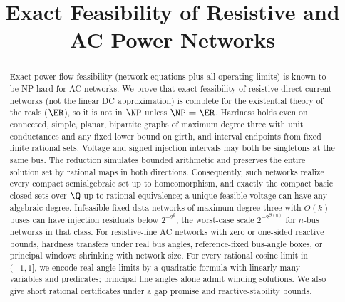 \documentclass[11pt]{article}
\title{Exact Feasibility of Resistive and AC Power Networks}
\author{}
\date{}
\begin{document}
\maketitle
\begin{abstract}
Exact power-flow feasibility (network equations plus all operating limits)
is known to be NP-hard for AC networks. We prove that exact feasibility of
resistive direct-current networks (not the linear DC approximation) is complete for
the existential theory of the reals ($\ER$), so it is not in $\NP$ unless
$\NP=\ER$. Hardness holds even on connected, simple, planar, bipartite
graphs of maximum degree three with unit conductances and any fixed lower
bound on girth, and interval endpoints from fixed finite rational sets.
Voltage and signed injection intervals may both be singletons at the same
bus. The reduction simulates bounded arithmetic and preserves the entire
solution set by rational maps in both directions. Consequently, such
networks realize every compact semialgebraic set up to homeomorphism, and exactly the compact basic closed
sets over $\Q$ up to rational equivalence; a unique feasible voltage can
have any algebraic degree. Infeasible fixed-data networks of maximum degree
three with $O(k)$ buses can have injection residuals below $2^{-2^k}$,
the worst-case scale $2^{-2^{\Theta(n)}}$ for $n$-bus networks in
that class. For resistive-line AC networks with zero or one-sided reactive
bounds, hardness transfers under real bus angles, reference-fixed bus-angle
boxes, or principal windows shrinking with network size. For every rational
cosine limit in $(-1,1]$, we encode real-angle limits by a quadratic formula
with linearly many variables and predicates; principal line angles alone
admit winding solutions. We also give short rational certificates under a
gap promise and reactive-stability bounds.
\end{abstract}








\appendix


\begingroup
\small


\endgroup
\end{document}
